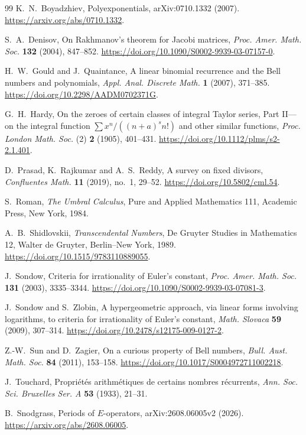 \documentclass[11pt]{article}
\theoremstyle{definition}
\theoremstyle{remark}
\begin{document}
\begin{thebibliography}{99}
K.~N.~Boyadzhiev,
\newblock Polyexponentials,
\newblock arXiv:0710.1332 (2007).
\newblock \url{https://arxiv.org/abs/0710.1332}.

S.~A.~Denisov,
\newblock On Rakhmanov's theorem for Jacobi matrices,
\newblock \emph{Proc. Amer. Math. Soc.} \textbf{132} (2004), 847--852.
\newblock \url{https://doi.org/10.1090/S0002-9939-03-07157-0}.

H.~W.~Gould and J.~Quaintance,
\newblock A linear binomial recurrence and the Bell numbers and polynomials,
\newblock \emph{Appl. Anal. Discrete Math.} \textbf{1} (2007), 371--385.
\newblock \url{https://doi.org/10.2298/AADM0702371G}.

G.~H.~Hardy,
\newblock On the zeroes of certain classes of integral Taylor series,
Part II---on the integral function
\(\sum x^n/((n+a)^s n!)\) and other similar functions,
\newblock \emph{Proc. London Math. Soc.} (2) \textbf{2} (1905), 401--431.
\newblock \url{https://doi.org/10.1112/plms/s2-2.1.401}.

D.~Prasad, K.~Rajkumar and A.~S.~Reddy,
\newblock A survey on fixed divisors,
\newblock \emph{Confluentes Math.} \textbf{11} (2019), no.~1, 29--52.
\newblock \url{https://doi.org/10.5802/cml.54}.

S.~Roman,
\newblock \emph{The Umbral Calculus},
\newblock Pure and Applied Mathematics 111, Academic Press, New York, 1984.

A.~B.~Shidlovskii,
\newblock \emph{Transcendental Numbers},
\newblock De Gruyter Studies in Mathematics 12, Walter de Gruyter,
Berlin--New York, 1989.
\newblock \url{https://doi.org/10.1515/9783110889055}.

J.~Sondow,
\newblock Criteria for irrationality of Euler's constant,
\newblock \emph{Proc. Amer. Math. Soc.} \textbf{131} (2003), 3335--3344.
\newblock \url{https://doi.org/10.1090/S0002-9939-03-07081-3}.

J.~Sondow and S.~Zlobin,
\newblock A hypergeometric approach, via linear forms involving logarithms,
to criteria for irrationality of Euler's constant,
\newblock \emph{Math. Slovaca} \textbf{59} (2009), 307--314.
\newblock \url{https://doi.org/10.2478/s12175-009-0127-2}.

Z.-W.~Sun and D.~Zagier,
\newblock On a curious property of Bell numbers,
\newblock \emph{Bull. Aust. Math. Soc.} \textbf{84} (2011), 153--158.
\newblock \url{https://doi.org/10.1017/S0004972711002218}.

J.~Touchard,
\newblock Propri\'et\'es arithm\'etiques de certains nombres r\'ecurrents,
\newblock \emph{Ann. Soc. Sci. Bruxelles Ser. A} \textbf{53} (1933), 21--31.

B.~Snodgrass,
\newblock Periods of \(E\)-operators,
\newblock arXiv:2608.06005v2 (2026).
\newblock \url{https://arxiv.org/abs/2608.06005}.

\end{thebibliography}
\end{document}
